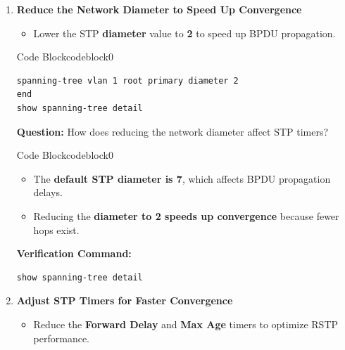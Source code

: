 \documentclass[a4paper]{book}
\begin{document}
\begin{enumerate}
	\item \textbf{Reduce the Network Diameter to Speed Up Convergence}
	      \begin{itemize}
		      \item Lower the STP \textbf{diameter} value to \textbf{2} to speed up BPDU propagation.
	      \end{itemize}



	      \begin{ocg}{Code Block}{codeblock}{0}
		      \vspace{0.5cm}
		      \begin{lstlisting}
spanning-tree vlan 1 root primary diameter 2
end
show spanning-tree detail
              \end{lstlisting}
	      \end{ocg}

	      \textbf{Question:} How does reducing the network diameter affect STP timers?


	      \begin{ocg}{Code Block}{codeblock}{0}
		      \vspace{0.5cm}
		      \begin{itemize}
			      \item The \textbf{default STP diameter is 7}, which affects BPDU propagation delays.
			      \item Reducing the \textbf{diameter to 2 speeds up convergence} because fewer hops exist.
		      \end{itemize}

		      \textbf{Verification Command:}
		      \begin{lstlisting}
show spanning-tree detail
                \end{lstlisting}
	      \end{ocg}




	\item \textbf{Adjust STP Timers for Faster Convergence}
	      \begin{itemize}
		      \item Reduce the \textbf{Forward Delay} and \textbf{Max Age} timers to optimize RSTP performance.
	      \end{itemize}


\end{enumerate}
\end{document}
